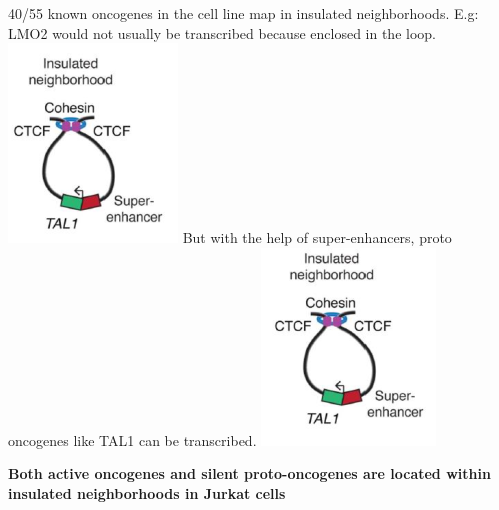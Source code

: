 40/55 known oncogenes in the cell line map in insulated neighborhoods.
E.g: LMO2 would not usually be transcribed because enclosed in the loop.
\includegraphics{../_resources/5843fc777ea1c41b8428ead29437d8dd.png}
But with the help of super-enhancers, proto oncogenes like TAL1 can be transcribed.
\includegraphics{../_resources/cb401de7a7d48b23211a6805d8eb892b.png}

\textbf{Both active oncogenes and silent proto-oncogenes are located within insulated
neighborhoods in Jurkat cells}

